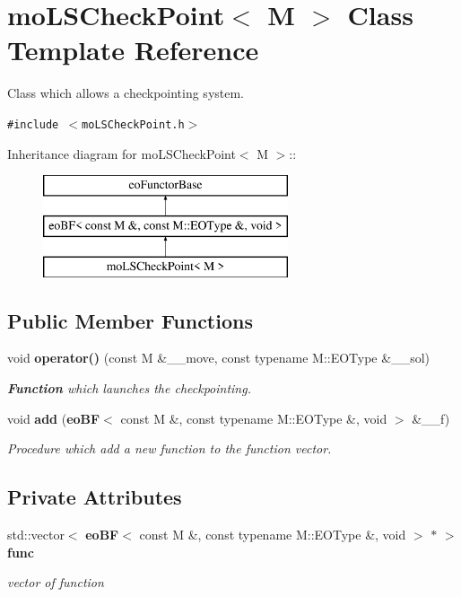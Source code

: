 \section{moLSCheckPoint$<$ M $>$ Class Template Reference}
\label{classmo_l_s_check_point}
Class which allows a checkpointing system.  


{\tt \#include $<$moLSCheckPoint.h$>$}

Inheritance diagram for moLSCheckPoint$<$ M $>$::\begin{figure}[H]
\begin{center}
\leavevmode
\includegraphics[height=3cm]{classmo_l_s_check_point}
\end{center}
\end{figure}
\subsection*{Public Member Functions}
\begin{CompactItemize}
\item 
void {\bf operator()} (const M \&\_\-\_\-move, const typename M::EOType \&\_\-\_\-sol)
\begin{CompactList}\small\item\em {\bf Function} which launches the checkpointing. \item\end{CompactList}\item 
void {\bf add} ({\bf eoBF}$<$ const M \&, const typename M::EOType \&, void $>$ \&\_\-\_\-f)
\begin{CompactList}\small\item\em Procedure which add a new function to the function vector. \item\end{CompactList}\end{CompactItemize}
\subsection*{Private Attributes}
\begin{CompactItemize}
\item 
std::vector$<$ {\bf eoBF}$<$ const M \&, const typename M::EOType \&, void $>$ $\ast$ $>$ {\bf func}\label{classmo_l_s_check_point_ff2a31ee5689a804bd9a572c51a36ca4}

\begin{CompactList}\small\item\em vector of function \item\end{CompactList}\end{CompactItemize}


